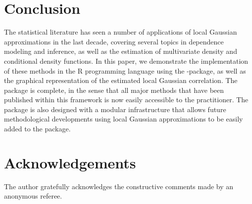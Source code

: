 \section{Conclusion} 

The statistical literature has seen a number of applications of local Gaussian approximations in the last decade, covering several topics in dependence modeling and inference, as well as the estimation of multivariate density and conditional density functions. In this paper, we demonstrate the implementation of these methods in the R programming language using the -package, as well as the graphical representation of the estimated local Gaussian correlation. The package is complete, in the sense that all major methods that have been published within this framework is now easily accessible to the practitioner. The package is also designed with a modular infrastructure that allows future methodological developments using local Gaussian approximations to be easily added to the package. 

\section{Acknowledgements}

The author gratefully acknowledges the constructive comments made by an anonymous referee.



\address{H{\aa}kon Otneim\\
  Department of Business and Management Science, \\
  NHH Norwegian School of Economics, \\
  Helleveien 30, 5045 BERGEN\\
  Norway\\
  }

